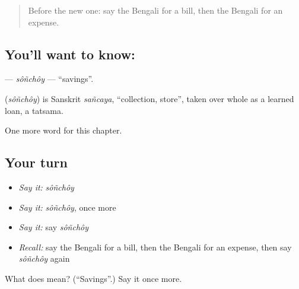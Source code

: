 \label{lesson:BN-C176-sonchoy}



\begin{quote}
Before the new one: say the Bengali for a bill, then the Bengali for an expense.
\end{quote}

\subsection*{You'll want to know: }
\textbf{} — \emph{sôñchôy} — \textquotedblleft{}savings\textquotedblright{}.

\begin{cousinweb}
\textbf{} (\emph{sôñchôy}) is Sanskrit \emph{sañcaya}, \textquotedblleft{}collection, store\textquotedblright{}, taken over whole as a learned loan, a tatsama.
\end{cousinweb}

\begin{grammarlens}[title={What you've built}]
One more word for this chapter.
\end{grammarlens}

\subsection*{Your turn}
\begin{itemize}
\raggedright
  \item \emph{Say it:} \emph{sôñchôy}
  \item \emph{Say it:} \emph{sôñchôy}, once more
  \item \emph{Say it:} say \emph{sôñchôy}
  \item \emph{Recall:} say the Bengali for a bill, then the Bengali for an expense, then say \emph{sôñchôy} again
\end{itemize}

\begin{tcolorbox}[breakable,colback=teal!4,colframe=teal!35!black,title={Before you move on}]
What does  mean? (\textquotedblleft{}Savings\textquotedblright{}.) Say it once more.
\end{tcolorbox}
